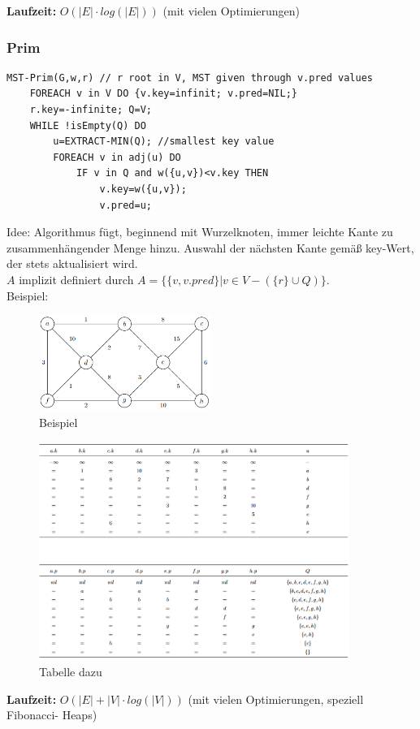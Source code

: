 \documentclass{article}
\begin{document}
                \newpage
                \textbf{Laufzeit:} $O(|E|\cdot log(|E|))$ (mit vielen Optimierungen)
            \subsubsection{Prim}
                \begin{lstlisting}[style=pseudocode]
MST-Prim(G,w,r) // r root in V, MST given through v.pred values
    FOREACH v in V DO {v.key=infinit; v.pred=NIL;}
    r.key=-infinite; Q=V;
    WHILE !isEmpty(Q) DO
        u=EXTRACT-MIN(Q); //smallest key value
        FOREACH v in adj(u) DO
            IF v in Q and w({u,v})<v.key THEN
                v.key=w({u,v});
                v.pred=u;
                \end{lstlisting}
                Idee: Algorithmus fügt, beginnend mit Wurzelknoten, immer leichte Kante zu zusammenhängender Menge hinzu. Auswahl der nächsten Kante gemäß key-Wert, der stets aktualisiert wird.\\
                $A$ implizit definiert durch $A=\{\{v,v.pred\}|v\in V-(\{r\}\cup Q)\}$.\\
                Beispiel:\\
                \begin{figure}[ht]
                    \centering
                    \includegraphics[width=0.5\textwidth]{Bilder/PrimBsp.png}
                    \caption{Beispiel}
                    \label{fig:PrimBsp}
                \end{figure}
                \begin{figure}[ht]
                    \centering
                    \includegraphics[width=0.9\textwidth]{Bilder/PrimBspTab.png}
                    \caption{Tabelle dazu}
                    \label{fig:PrimBspTab}
                \end{figure}
                \newpage
                \textbf{Laufzeit:} $O(|E|+|V|\cdot log(|V|))$ (mit vielen Optimierungen, speziell Fibonacci- Heaps)
\end{document}
